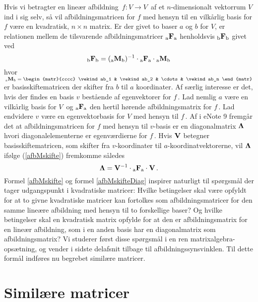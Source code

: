 Hvis vi betragter en lineær afbildning $\,f:V\rightarrow V\,$ af et $n$-dimensionalt vektorrum $V$ ind i sig selv, så vil afbildningsmatricen for $f$ med hensyn til en vilkårlig basis for $f$ være en kvadratisk, $n \times n$ matrix. Er der givet to baser $a$ og $b$ for $V$, er 
relationen mellem de tilsvarende afbildningsmatricer ${_\mathrm{a}\mathbf{F}_\mathrm{a}}$ henholdsvis ${_\mathrm{b}\mathbf{F}_\mathrm{b}}$ givet ved
\begin{equation}\label{afbMskifte}
{_\mathrm{b}\mathbf{F}_\mathrm{b}} = ({_\mathrm{a}\mathbf{M}_\mathrm{b}})^{-1} \cdot {_\mathrm{a}\mathbf{F}_\mathrm{a}} \cdot {_\mathrm{a}\mathbf{M}_\mathrm{b}} 
\end{equation}
hvor
$\,\matind aMb = \begin{matr}{cccc} \vekind ab_1 & \vekind ab_2 & \cdots & \vekind ab_n \end{matr}\,$
er basisskiftematricen der skifter fra $b$ til $a$ koordinater.\bs
Af særlig interesse er det, hvis der findes en basis $v$ bestående af egenvektorer for $f\,.$ Lad nemlig $a$ være en vilkårlig basis for $V\,$ og ${_\mathrm{a}\mathbf{F}_\mathrm{a}}$ den hertil hørende afbildningsmatrix for $f\,$. Lad endvidere $v$ være en egenvektorbasis for $V$ med hensyn til $f\,.$ Af  i eNote 9 fremgår det at afbildningsmatricen for $f$ med hensyn til $v$-basis er en diagonalmatrix $\bm{\Lambda}$ hvori diagonalelementerne er egenværdierne for $f\,.$ Hvis 
$\mathbf{V}$ betegner basisskiftematricen, som skifter fra $v$-koordinater til $a$-koordinatvektorerne, vil $\bm{\Lambda}$ ifølge (\ref{afbMskifte}) fremkomme således
\begin{equation}\label{afbMskifteDiag}
\bm{\Lambda} = \mathbf{V}^{-1} \cdot {_\mathrm{a}\mathbf{F}_\mathrm{a}} \cdot \mathbf{V}\,. 
\end{equation}%
Formel \ref{afbMskifte} og formel \ref{afbMskifteDiag} inspirer naturligt til spørgsmål der tager udgangspunkt i kvadratiske matricer: Hvilke betingelser skal være opfyldt for at to givne kvadratiske matricer kan fortolkes som  afbildningsmatricer for den samme lineære afbildning med hensyn til to forskellige baser? Og hvilke betingelser skal en kvadratisk matrix opfylde for at den er afbildningsmatrix for en lineær afbildning, som i en anden basis har en diagonalmatrix som afbildningsmatrix? Vi studerer først disse spørgsmål i en ren matrixalgebra-opsætning, og vender i sidste delafsnit tilbage til afbildningssynsvinklen. Til dette formål indføres nu begrebet similære matricer.\bs

\section{Similære matricer}

